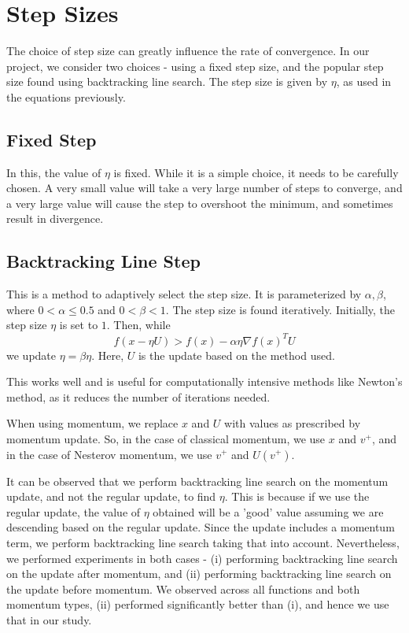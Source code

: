 \documentclass{article}
\begin{document}
\section{Step Sizes}\label{step}
The choice of step size can greatly influence the rate of convergence. In our project, we consider two choices - using a fixed step size, and the popular step size found using backtracking line search. The step size is given by $\eta$, as used in the equations previously.

\subsection{Fixed Step}
In this, the value of $\eta$ is fixed. While it is a simple choice, it needs to be carefully chosen. A very small value will take a very large number of steps to converge, and a very large value will cause the step to overshoot the minimum, and sometimes result in divergence.

\subsection{Backtracking Line Step}
This is a method to adaptively select the step size. It is parameterized by $\alpha,\beta$, where $0<\alpha\le0.5$ and $0<\beta<1$. The step size is found iteratively. Initially, the step size $\eta$ is set to $1$. Then, while
\begin{equation}
f(x-\eta U) > f(x) - \alpha \eta \nabla f(x)^T U
\end{equation}
we update $\eta = \beta \eta$. Here, $U$ is the update based on the method used.

This works well and is useful for computationally intensive methods like Newton's method, as it reduces the number of iterations needed.

When using momentum, we replace $x$ and $U$ with values as prescribed by momentum update. So, in the case of classical momentum, we use $x$ and $v^+$, and in the case of Nesterov momentum, we use $v^+$ and $U(v^+)$.

It can be observed that we perform backtracking line search on the momentum update, and not the regular update, to find $\eta$. This is because if we use the regular update, the value of $\eta$ obtained will be a 'good' value assuming we are descending based on the regular update. Since the update includes a momentum term, we perform backtracking line search taking that into account. Nevertheless, we performed experiments in both cases - (i) performing backtracking line search on the update after momentum, and (ii) performing backtracking line search on the update before momentum. We observed across all functions and both momentum types, (ii) performed significantly better than (i), and hence we use that in our study.
\end{document}

